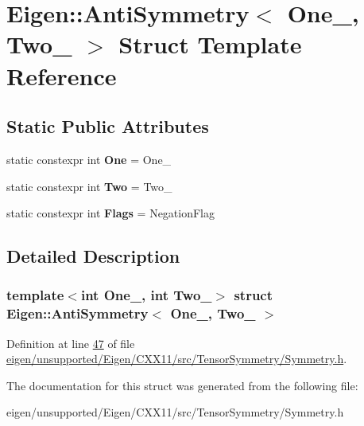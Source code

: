\hypertarget{struct_eigen_1_1_anti_symmetry}{}\section{Eigen\+:\+:Anti\+Symmetry$<$ One\+\_\+, Two\+\_\+ $>$ Struct Template Reference}
\label{struct_eigen_1_1_anti_symmetry}
\subsection*{Static Public Attributes}
\begin{DoxyCompactItemize}
\item 
\mbox{\label{struct_eigen_1_1_anti_symmetry_ad25ceedce7a10a8f6dbaba0f177d55c2}} 
static constexpr int {\bfseries One} = One\+\_\+
\item 
\mbox{\label{struct_eigen_1_1_anti_symmetry_a01f147f46ebb18d5802b595e23898c66}} 
static constexpr int {\bfseries Two} = Two\+\_\+
\item 
\mbox{\label{struct_eigen_1_1_anti_symmetry_a91329ac8680af3f0786955d8b845968e}} 
static constexpr int {\bfseries Flags} = Negation\+Flag
\end{DoxyCompactItemize}


\subsection{Detailed Description}
\subsubsection*{template$<$int One\+\_\+, int Two\+\_\+$>$\newline
struct Eigen\+::\+Anti\+Symmetry$<$ One\+\_\+, Two\+\_\+ $>$}



Definition at line \hyperlink{eigen_2unsupported_2_eigen_2_c_x_x11_2src_2_tensor_symmetry_2_symmetry_8h_source_l00047}{47} of file \hyperlink{eigen_2unsupported_2_eigen_2_c_x_x11_2src_2_tensor_symmetry_2_symmetry_8h_source}{eigen/unsupported/\+Eigen/\+C\+X\+X11/src/\+Tensor\+Symmetry/\+Symmetry.\+h}.



The documentation for this struct was generated from the following file\+:\begin{DoxyCompactItemize}
\item 
eigen/unsupported/\+Eigen/\+C\+X\+X11/src/\+Tensor\+Symmetry/\+Symmetry.\+h\end{DoxyCompactItemize}
